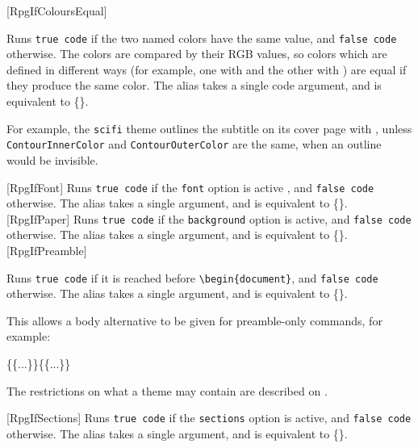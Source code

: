 		[RpgIfColoursEqual]{}
		{
			Runs \texttt{true code} if the two named colors have the same value, and \texttt{false code} otherwise. The colors are compared by their RGB values, so colors which are defined in different ways (for example, one with  and the other with ) are equal if they produce the same color. The alias  takes a single code argument, and is equivalent to \{\}.

			For example, the \texttt{scifi} theme outlines the subtitle on its cover page with , unless \texttt{ContourInnerColor} and \texttt{ContourOuterColor} are the same, when an outline would be invisible.
		}
		[RpgIfFont]{}
		{
			Runs \texttt{true code} if the \texttt{font} option is active , and \texttt{false code} otherwise. The alias  takes a single argument, and is equivalent to \{\}.
		}
		[RpgIfPaper]{}
		{
			Runs \texttt{true code} if the \texttt{background} option is active, and \texttt{false code} otherwise. The alias  takes a single argument, and is equivalent to \{\}.
		}
		[RpgIfPreamble]{}
		{
			Runs \texttt{true code} if it is reached before \texttt{\textbackslash begin\{document\}}, and \texttt{false code} otherwise. The alias  takes a single argument, and is equivalent to \{\}.

			This allows a body alternative to be given for preamble-only commands, for example:
			\begin{Code}
				\{\{...\}\}\{\{...\}\}
			\end{Code}
			The restrictions on what a theme may contain are described on .
		}
		[RpgIfSections]{}
		{
			Runs \texttt{true code} if the \texttt{sections} option is active, and \texttt{false code} otherwise. The alias  takes a single argument, and is equivalent to \{\}.
		}
